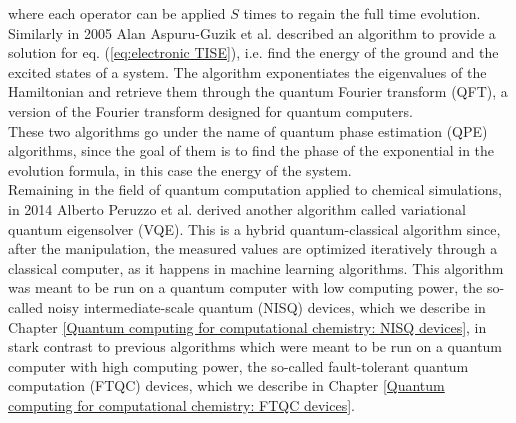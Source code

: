 where each operator can be applied $S$ times to regain the full time evolution. \\
Similarly in 2005 Alan Aspuru-Guzik et al. \cite{Aspuru-Guzik2005Sep} described an algorithm to provide a solution for eq. (\ref{eq:electronic TISE}), i.e. find the energy of the ground and the excited states of a system. The algorithm exponentiates the eigenvalues of the Hamiltonian and retrieve them through the quantum Fourier transform (QFT), a version of the Fourier transform designed for quantum computers. \\
These two algorithms go under the name of quantum phase estimation (QPE) algorithms, since the goal of them is to find the phase of the exponential in the evolution formula, in this case the energy of the system. \\
Remaining in the field of quantum computation applied to chemical simulations, in 2014 Alberto Peruzzo et al. \cite{Peruzzo2014Jul} derived another algorithm called variational quantum eigensolver (VQE). This is a hybrid quantum-classical algorithm since, after the manipulation, the measured values are optimized iteratively through a classical computer, as it happens in machine learning algorithms. This algorithm was meant to be run on a quantum computer with low computing power, the so-called noisy intermediate-scale quantum (NISQ) devices, which we describe in Chapter \ref{Quantum computing for computational chemistry: NISQ devices}, in stark contrast to previous algorithms which were meant to be run on a quantum computer with high computing power, the so-called fault-tolerant quantum computation (FTQC) devices, which we describe in Chapter \ref{Quantum computing for computational chemistry: FTQC devices}.